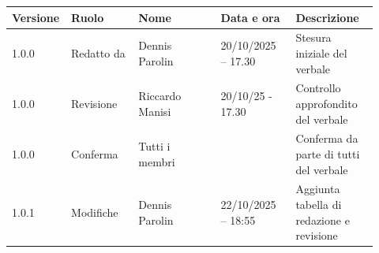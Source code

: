 \documentclass[a4paper,12pt]{article}
\begin{document}
\begin{center}
\small
\renewcommand{\arraystretch}{1.2} 
\begin{tabular}{|p{0.1\linewidth}|p{0.18\linewidth}|p{0.22\linewidth}|p{0.20\linewidth}|p{0.22\linewidth}|}
\hline
\rowcolor{gray!60} 
\textbf{Versione} & \textbf{Ruolo} & \textbf{Nome} & \textbf{Data e ora} & \textbf{Descrizione} \\
\hline
\rowcolor{white}
1.0.0 & Redatto da & Dennis Parolin & 20/10/2025 – 17.30 & Stesura iniziale del verbale \\
\hline
\rowcolor{gray!20}
1.0.0 & Revisione & Riccardo Manisi & 20/10/25 - 17.30 & Controllo approfondito del verbale \\
\hline
\rowcolor{white}
1.0.0 & Conferma & Tutti i membri &  & Conferma da parte di tutti del verbale \\
\hline
\rowcolor{gray!20}
1.0.1 & Modifiche & Dennis Parolin & 22/10/2025 – 18:55 & Aggiunta tabella di redazione e revisione \\
\hline
\end{tabular}
\end{center}
\end{document}
